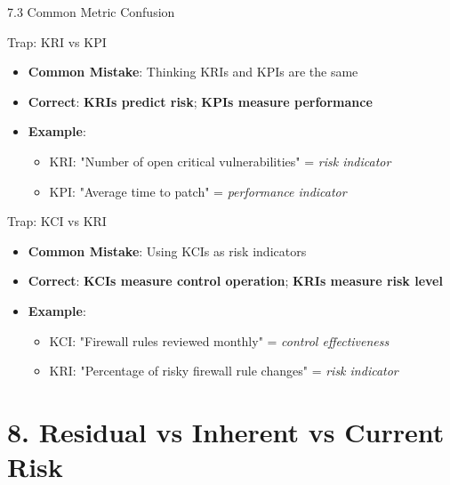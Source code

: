 \documentclass{beamer}
\begin{document}
	\begin{frame}{7.3 Common Metric Confusion}
		\begin{block}{Trap: KRI vs KPI}
			\begin{itemize}
				\item \textbf{Common Mistake}: Thinking KRIs and KPIs are the same
				\item \textbf{Correct}: \textbf{KRIs predict risk}; \textbf{KPIs measure performance}
				\item \textbf{Example}: 
				\begin{itemize}
					\item KRI: "Number of open critical vulnerabilities" = \textit{risk indicator}
					\item KPI: "Average time to patch" = \textit{performance indicator}
				\end{itemize}
			\end{itemize}
		\end{block}
		
		\begin{block}{Trap: KCI vs KRI}
			\begin{itemize}
				\item \textbf{Common Mistake}: Using KCIs as risk indicators
				\item \textbf{Correct}: \textbf{KCIs measure control operation}; \textbf{KRIs measure risk level}
				\item \textbf{Example}:
				\begin{itemize}
					\item KCI: "Firewall rules reviewed monthly" = \textit{control effectiveness}
					\item KRI: "Percentage of risky firewall rule changes" = \textit{risk indicator}
				\end{itemize}
			\end{itemize}
		\end{block}
	\end{frame}
	
	\section{8. Residual vs Inherent vs Current Risk}
	
\end{document}
